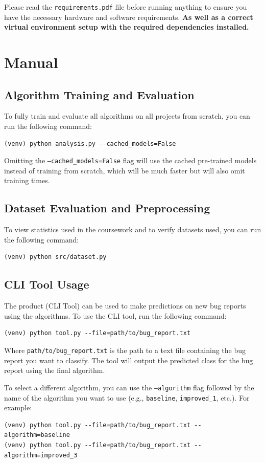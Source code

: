 \documentclass{article}
\begin{document}
Please read the \texttt{requirements.pdf} file before running anything to ensure you have the necessary hardware and software requirements.
\textbf{As well as a correct virtual environment setup with the required dependencies installed.}

\vspace{10px}

\section*{Manual}

\subsection*{Algorithm Training and Evaluation}

To fully train and evaluate all algorithms on all projects from scratch, you can run the following command:
\begin{verbatim}
(venv) python analysis.py --cached_models=False
\end{verbatim}

Omitting the \texttt{--cached\_models=False} flag will use the cached pre-trained models instead of training from scratch, which will be much faster but will also omit training times.

\subsection*{Dataset Evaluation and Preprocessing}

To view statistics used in the coursework and to verify datasets used, you can run the following command:
\begin{verbatim}
(venv) python src/dataset.py
\end{verbatim}


\subsection*{CLI Tool Usage}

The product (CLI Tool) can be used to make predictions on new bug reports using the algorithms. To use the CLI tool, run the following command:
\begin{verbatim}
(venv) python tool.py --file=path/to/bug_report.txt
\end{verbatim}

Where \texttt{path/to/bug\_report.txt} is the path to a text file containing the bug report you want to classify. The tool will output the predicted class for the bug report using the final algorithm.

To select a different algorithm, you can use the \texttt{--algorithm} flag followed by the name of the algorithm you want to use (e.g., \texttt{baseline}, \texttt{improved\_1}, etc.). For example:
\begin{verbatim}
(venv) python tool.py --file=path/to/bug_report.txt --algorithm=baseline
(venv) python tool.py --file=path/to/bug_report.txt --algorithm=improved_3
\end{verbatim}
\end{document}
